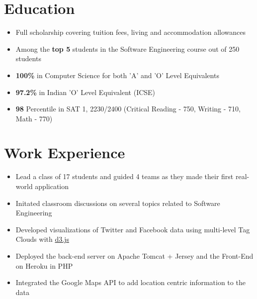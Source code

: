 \documentclass[11pt,a4paper]{moderncv}
\begin{document}
\makecvtitle

\section{Education}
{\begin{itemize}
        \item Full scholarship covering tuition fees, living and accommodation allowances
        \item Among the \textbf{top 5} students in the Software Engineering course out of 250 students
 \end{itemize}}

{\begin{itemize}
        \item \textbf{100\%} in Computer Science for both 'A' and 'O' Level Equivalents
        \item \textbf{97.2\%} in Indian 'O' Level Equivalent (ICSE)
        \item \textbf{98} Percentile in SAT 1, 2230/2400 (Critical Reading - 750, Writing - 710, Math - 770)
 \end{itemize}}

\section{Work Experience}
{\begin{itemize}
        \item Lead a class of 17 students and guided 4 teams as they made their first real-world application
        \item Initated classroom discussions on several topics related to Software Engineering
 \end{itemize}}

{\begin{itemize}
        \item Developed visualizations of Twitter and Facebook data using multi-level Tag Clouds with \href{http://d3js.org/}{d3.js}
        \item Deployed the back-end server on Apache Tomcat + Jersey and the Front-End on Heroku in PHP
        \item Integrated the Google Maps API to add location centric information to the data
 \end{itemize}}
\end{document}

